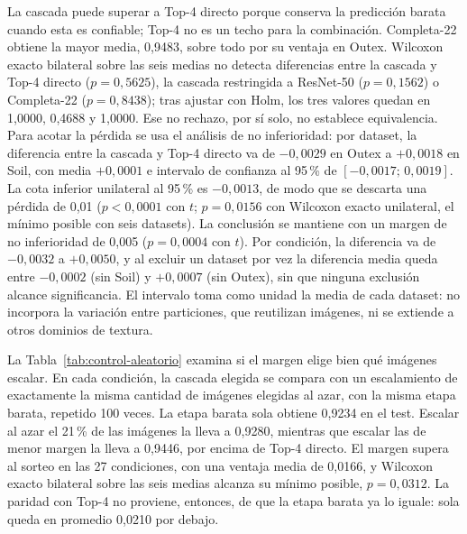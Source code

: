 \documentclass[a4paper,fleqn]{cas-sc}
\begin{document}
La cascada puede superar a Top-4 directo porque conserva la predicción barata cuando esta es confiable; Top-4 no es un techo para la combinación. Completa-22 obtiene la mayor media, 0,9483, sobre todo por su ventaja en Outex. Wilcoxon exacto bilateral sobre las seis medias no detecta diferencias entre la cascada y Top-4 directo ($p=0{,}5625$), la cascada restringida a ResNet-50 ($p=0{,}1562$) o Completa-22 ($p=0{,}8438$); tras ajustar con Holm, los tres valores quedan en 1,0000, 0,4688 y 1,0000. Ese no rechazo, por sí solo, no establece equivalencia. Para acotar la pérdida se usa el análisis de no inferioridad: por dataset, la diferencia entre la cascada y Top-4 directo va de $-0{,}0029$ en Outex a $+0{,}0018$ en Soil, con media $+0{,}0001$ e intervalo de confianza al 95\,\% de $[-0{,}0017;\,0{,}0019]$. La cota inferior unilateral al 95\,\% es $-0{,}0013$, de modo que se descarta una pérdida de 0,01 ($p<0{,}0001$ con $t$; $p=0{,}0156$ con Wilcoxon exacto unilateral, el mínimo posible con seis datasets). La conclusión se mantiene con un margen de no inferioridad de 0,005 ($p=0{,}0004$ con $t$). Por condición, la diferencia va de $-0{,}0032$ a $+0{,}0050$, y al excluir un dataset por vez la diferencia media queda entre $-0{,}0002$ (sin Soil) y $+0{,}0007$ (sin Outex), sin que ninguna exclusión alcance significancia. El intervalo toma como unidad la media de cada dataset: no incorpora la variación entre particiones, que reutilizan imágenes, ni se extiende a otros dominios de textura.

La Tabla~\ref{tab:control-aleatorio} examina si el margen elige bien qué imágenes escalar. En cada condición, la cascada elegida se compara con un escalamiento de exactamente la misma cantidad de imágenes elegidas al azar, con la misma etapa barata, repetido 100 veces. La etapa barata sola obtiene 0,9234 en el test. Escalar al azar el 21\,\% de las imágenes la lleva a 0,9280, mientras que escalar las de menor margen la lleva a 0,9446, por encima de Top-4 directo. El margen supera al sorteo en las 27 condiciones, con una ventaja media de 0,0166, y Wilcoxon exacto bilateral sobre las seis medias alcanza su mínimo posible, $p=0{,}0312$. La paridad con Top-4 no proviene, entonces, de que la etapa barata ya lo iguale: sola queda en promedio 0,0210 por debajo.
\end{document}
